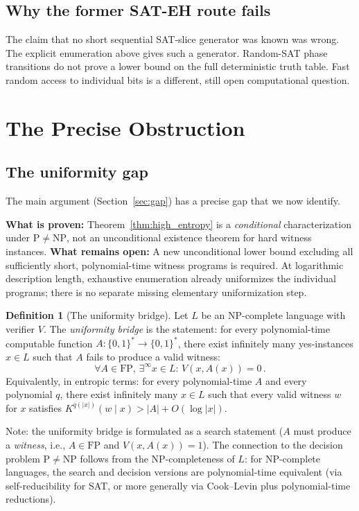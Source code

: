 \documentclass[aps,prd,twocolumn,superscriptaddress,nofootinbib]{revtex4-2}
\theoremstyle{definition}
\newtheorem{definition}[theorem]{Definition}
\theoremstyle{remark}
\newcommand{\NP}{\mathrm{NP}}
\newcommand{\PP}{\mathrm{P}}
\begin{document}
\subsection{Why the former SAT-EH route fails}
The claim that no short sequential SAT-slice generator was known was wrong.
The explicit enumeration above gives such a generator.
Random-SAT phase transitions do not prove a lower bound on the full
deterministic truth table. Fast random access to individual bits is a
different, still open computational question.

\section{The Precise Obstruction}
\label{sec:obstruction}

\subsection{The uniformity gap}

The main argument (Section~\ref{sec:gap}) has a precise gap that we now identify.

\textbf{What is proven:} Theorem~\ref{thm:high_entropy} is a
\emph{conditional} characterization under $\PP\ne\NP$, not an
unconditional existence theorem for hard witness instances.
\textbf{What remains open:} A new unconditional lower bound excluding
all sufficiently short, polynomial-time witness programs is required.
At logarithmic description length, exhaustive enumeration already
uniformizes the individual programs; there is no separate missing
elementary uniformization step.

\begin{definition}[The uniformity bridge]
\label{def:uniformity}
Let $L$ be an NP-complete language with verifier $V$. The \textit{uniformity bridge} is the statement: for every polynomial-time computable function $A: \{0,1\}^* \to \{0,1\}^*$, there exist infinitely many yes-instances $x \in L$ such that $A$ fails to produce a valid witness:
\begin{equation}
\forall A \in \mathrm{FP},\, \exists^\infty x \in L:\, V(x, A(x)) = 0\,.
\end{equation}
Equivalently, in entropic terms: for every polynomial-time $A$ and every polynomial $q$, there exist infinitely many $x \in L$ such that every valid witness $w$ for $x$ satisfies $K^{q(|x|)}(w \mid x) > |A| + O(\log|x|)$.

Note: the uniformity bridge is formulated as a search statement ($A$ must produce a \textit{witness}, i.e., $A \in \mathrm{FP}$ and $V(x, A(x)) = 1$). The connection to the decision problem $\PP \neq \NP$ follows from the NP-completeness of $L$: for NP-complete languages, the search and decision versions are polynomial-time equivalent (via self-reducibility for SAT, or more generally via Cook--Levin plus polynomial-time reductions).
\end{definition}
\end{document}
